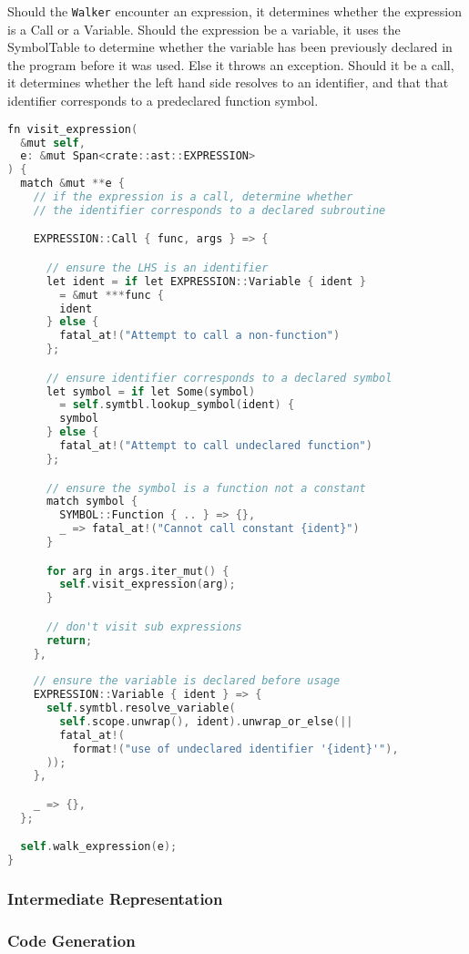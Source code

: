 Should the \texttt{Walker} encounter an expression, it determines whether the expression is a Call or a Variable. Should the expression be a variable, it uses the SymbolTable to determine whether the variable has been previously declared in the program before it was used. Else it throws an exception. Should it be a call, it determines whether the left hand side resolves to an identifier, and that that identifier corresponds to a predeclared function symbol.

\begin{lstlisting}[language=C]
fn visit_expression(
  &mut self, 
  e: &mut Span<crate::ast::EXPRESSION>
) {
  match &mut **e {
    // if the expression is a call, determine whether
    // the identifier corresponds to a declared subroutine

    EXPRESSION::Call { func, args } => {

      // ensure the LHS is an identifier 
      let ident = if let EXPRESSION::Variable { ident } 
        = &mut ***func {
        ident
      } else {
        fatal_at!("Attempt to call a non-function")
      };

      // ensure identifier corresponds to a declared symbol
      let symbol = if let Some(symbol) 
        = self.symtbl.lookup_symbol(ident) {
        symbol
      } else {
        fatal_at!("Attempt to call undeclared function")
      };

      // ensure the symbol is a function not a constant
      match symbol {
        SYMBOL::Function { .. } => {},
        _ => fatal_at!("Cannot call constant {ident}")
      }

      for arg in args.iter_mut() {
        self.visit_expression(arg);
      }

      // don't visit sub expressions
      return; 
    },
    
    // ensure the variable is declared before usage
    EXPRESSION::Variable { ident } => {
      self.symtbl.resolve_variable(
        self.scope.unwrap(), ident).unwrap_or_else(|| 
        fatal_at!(
          format!("use of undeclared identifier '{ident}'"),
      ));
    },

    _ => {},
  };

  self.walk_expression(e);
}
\end{lstlisting}

\subsubsection{Intermediate Representation}
\subsubsection{Code Generation}